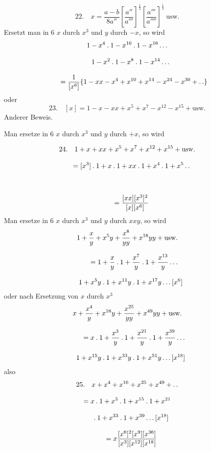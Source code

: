 \[
22.\quad x=\frac{a-b}{8a''}\left[\frac{a''}{a'''}\right]^{\frac12}
\left[\frac{a'''}{a''''}\right]^{\frac14}\ \mathrm{usw.}
\]
Ersetzt man in 6 $x$ durch $x^3$ und $y$ durch $-x$, so wird
\[
\begin{gathered}
1-x^4\mathbin{.}1-x^{10}\mathbin{.}1-x^{16}\mathinner{.\,.\,.}
\\[8pt]\quad{}1-x^2\mathbin{.}1-x^8\mathbin{.}1-x^{14}\mathinner{.\,.\,.}\\[8pt]
\qquad=\frac{1}{[x^6]}\{1-xx-x^4+x^{10}+x^{14}-x^{24}-x^{30}+\mathinner{.\,.}\}
\end{gathered}
\]
oder
\[
23.\quad[x]=1-x-xx+x^5+x^7-x^{12}-x^{15}+\mathrm{usw.}
\]
Anderer Beweis.

Man ersetze in 6 $x$ durch $x^3$ und $y$ durch $+x$, so wird

\[
\begin{gathered}
24.\quad 1+x+xx+x^{5}+x^{7}+x^{12}+x^{15}+\mathrm{usw.}
 \\[8pt]\quad{}= [x^{3}]\mathbin{.}1+x\mathbin{.}1+xx\mathbin{.}1+x^{4}\mathbin{.}1+x^{5}\mathinner{.\,.}\\[8pt]
 \\[8pt]\quad{}=\frac{[xx][x^{3}]^{2}}{[x][x^{6}]}
\end{gathered}
\]
Man ersetze in 6 $x$ durch $x^{3}$ und $y$ durch $xxy$, so wird
\[
\begin{gathered}
1+\frac{x}{y}+x^{5}y+\frac{x^{8}}{yy}+x^{16}yy+\mathrm{usw.}\\[8pt]
\qquad=1+\frac{x}{y}\mathbin{.}1+\frac{x^{7}}{y}\mathbin{.}1+\frac{x^{13}}{y}\mathinner{.\,.\,.}
  \\[8pt]\quad{}1+x^{5}y\mathbin{.}1+x^{11}y\mathbin{.}1+x^{17}y\mathinner{.\,.\,.}[x^{6}]
\end{gathered}
\]
oder nach Ersetzung von $x$ durch $x^{3}$
\[
\begin{gathered}
x+\frac{x^{4}}{y}+x^{16}y+\frac{x^{25}}{yy}+x^{49}yy+\mathrm{usw.}\\[8pt]
\qquad=x\mathbin{.}1+\frac{x^{3}}{y}\mathbin{.}1+\frac{x^{21}}{y}\mathbin{.}1+\frac{x^{39}}{y}\mathinner{.\,.\,.}
  \\[8pt]\quad{}1+x^{15}y\mathbin{.}1+x^{33}y\mathbin{.}1+x^{51}y\mathinner{.\,.\,.}[x^{18}]
\end{gathered}
\]
also
\[
\begin{gathered}
25.\quad x+x^{4}+x^{16}+x^{25}+x^{49}+\mathinner{.\,.}\\[8pt]
 =x\mathbin{.}1+x^{3}\mathbin{.}1+x^{15}\mathbin{.}1+x^{21}\\[8pt]\quad{}\mathbin{.}1+x^{33}\mathbin{.}1+x^{39}\mathinner{.\,.\,.}[x^{18}]
 \\[8pt]\quad{}=x\frac{[x^{6}]^{2}[x^{9}][x^{36}]}{[x^{3}][x^{12}][x^{18}]}
\end{gathered}
\]

